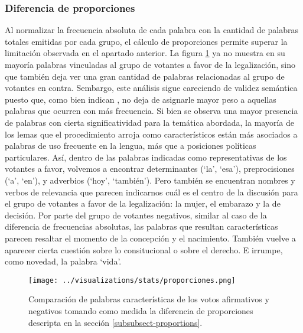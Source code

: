 \subsubsection{Diferencia de proporciones}
Al normalizar la frecuencia absoluta de cada palabra con la cantidad
de palabras totales emitidas por cada grupo, el cálculo de proporciones permite
superar la limitación observada en el apartado anterior.
La figura \ref{fig-statistics-proportions} ya no muestra en su mayoría palabras
vinculadas al grupo de votantes a favor de la legalización, sino que también
deja ver una gran cantidad de palabras relacionadas al grupo de votantes en contra.
Sembargo, este análisis sigue careciendo de validez semántica puesto que, como bien
indican \cite{monroe2008fightin}, no deja de asignarle mayor peso a aquellas palabras
que ocurren con más frecuencia. Si bien se observa una mayor presencia de palabras
con cierta significatividad para la temática abordada, la mayoría de los lemas
que el procedimiento arroja como característicos están más asociados a palabras
de uso frecuente en la lengua, más que a posiciones políticas particulares. Así,
dentro de las palabras indicadas como representativas de los votantes a favor,
volvemos a encontrar determinantes (`la', `esa'), preprocisiones (`a', `en'),
y adverbios (`hoy', `también'). Pero también se encuentran nombres y verbos
de relevancia que parecen indicarnos cuál es el centro de la discusión para el
grupo de votantes a favor de la legalización: la mujer, el embarazo y la
de decisión. Por parte del grupo de votantes negativos, similar al caso de
la diferencia de frecuencias absolutas, las palabras que resultan
características parecen resaltar  el momento de la concepción y el nacimiento.
También vuelve a aparecer cierta cuestión sobre lo consitucional o sobre el derecho.
E irrumpe, como novedad, la palabra `vida'.

\begin{figure}[h!]
    \centering
    \texttt{[image: ../visualizations/stats/proporciones.png]}
    \caption{Comparación de palabras características de los votos afirmativos y
    negativos tomando como medida la diferencia de proporciones descripta
    en la sección \ref{subsubsect-proportions}.}
    \label{fig-statistics-proportions}
\end{figure}

